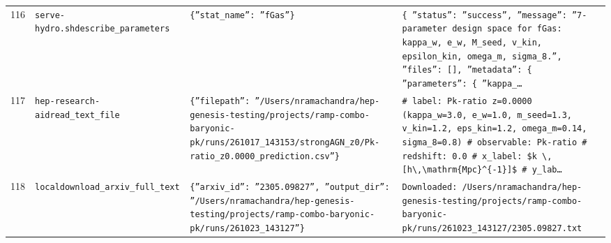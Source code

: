 \documentclass[11pt,a4paper]{article}
\begin{document}
\begin{longtable}{@{}p{}p{}p{}p{}@{}}
116 & \texttt{serve-hydro.sh}\newline\texttt{describe\_\allowbreak{}parameters} & \texttt{\{''stat\_\allowbreak{}name'':\allowbreak{} ''fGas''\}\allowbreak{}} & \texttt{\{   ''status'':\allowbreak{} ''success'',\allowbreak{}   ''message'':\allowbreak{} ''7-parameter design space for fGas:\allowbreak{} kappa\_\allowbreak{}w,\allowbreak{} e\_\allowbreak{}w,\allowbreak{} M\_\allowbreak{}seed,\allowbreak{} v\_\allowbreak{}kin,\allowbreak{} epsilon\_\allowbreak{}kin,\allowbreak{} omega\_\allowbreak{}m,\allowbreak{} sigma\_\allowbreak{}8.'',\allowbreak{}   ''files'':\allowbreak{} []\allowbreak{},\allowbreak{}   ''metadata'':\allowbreak{} \{     ''parameters'':\allowbreak{} \{       ''kappa\_\allowbreak{}\ldots{}\allowbreak{}} \\
117 & \texttt{hep-research-aid}\newline\texttt{read\_\allowbreak{}text\_\allowbreak{}file} & \texttt{\{''filepath'':\allowbreak{} ''/\allowbreak{}Users/\allowbreak{}nramachandra/\allowbreak{}hep-genesis-testing/\allowbreak{}projects/\allowbreak{}ramp-combo-baryonic-pk/\allowbreak{}runs/\allowbreak{}261017\_\allowbreak{}143153/\allowbreak{}strongAGN\_\allowbreak{}z0/\allowbreak{}Pk-ratio\_\allowbreak{}z0.0000\_\allowbreak{}prediction.csv''\}\allowbreak{}} & \texttt{\# label:\allowbreak{} Pk-ratio z=\allowbreak{}0.0000 (kappa\_\allowbreak{}w=\allowbreak{}3.0,\allowbreak{} e\_\allowbreak{}w=\allowbreak{}1.0,\allowbreak{} m\_\allowbreak{}seed=\allowbreak{}1.3,\allowbreak{} v\_\allowbreak{}kin=\allowbreak{}1.2,\allowbreak{} eps\_\allowbreak{}kin=\allowbreak{}1.2,\allowbreak{} omega\_\allowbreak{}m=\allowbreak{}0.14,\allowbreak{} sigma\_\allowbreak{}8=\allowbreak{}0.8)\allowbreak{} \# observable:\allowbreak{} Pk-ratio \# redshift:\allowbreak{} 0.0 \# x\_\allowbreak{}label:\allowbreak{} \$k \textbackslash{}\allowbreak{},\allowbreak{} [h\textbackslash{}\allowbreak{},\allowbreak{}\textbackslash{}\allowbreak{}mathrm\{Mpc\}\allowbreak{}\textasciicircum{}\allowbreak{}\{-1\}\allowbreak{}]\allowbreak{}\$ \# y\_\allowbreak{}lab\ldots{}\allowbreak{}} \\
118 & \texttt{local}\newline\texttt{download\_\allowbreak{}arxiv\_\allowbreak{}full\_\allowbreak{}text} & \texttt{\{''arxiv\_\allowbreak{}id'':\allowbreak{} ''2305.09827'',\allowbreak{} ''output\_\allowbreak{}dir'':\allowbreak{} ''/\allowbreak{}Users/\allowbreak{}nramachandra/\allowbreak{}hep-genesis-testing/\allowbreak{}projects/\allowbreak{}ramp-combo-baryonic-pk/\allowbreak{}runs/\allowbreak{}261023\_\allowbreak{}143127''\}\allowbreak{}} & \texttt{Downloaded:\allowbreak{} /\allowbreak{}Users/\allowbreak{}nramachandra/\allowbreak{}hep-genesis-testing/\allowbreak{}projects/\allowbreak{}ramp-combo-baryonic-pk/\allowbreak{}runs/\allowbreak{}261023\_\allowbreak{}143127/\allowbreak{}2305.09827.txt} \\

\end{longtable}
\end{document}

